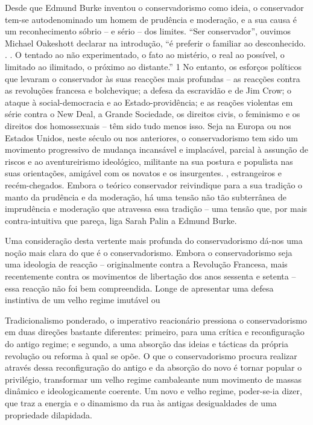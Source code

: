 Desde que Edmund Burke inventou o conservadorismo como ideia, o conservador tem-se autodenominado um homem de prudência e moderação, e a sua causa é um reconhecimento sóbrio – e sério – dos limites. “Ser conservador”, ouvimos Michael Oakeshott declarar na introdução, “é preferir o familiar ao desconhecido. . . O tentado ao não experimentado, o fato ao mistério, o real ao possível, o limitado ao ilimitado, o próximo ao distante.” {\color{blue}1} No entanto, os esforços políticos que levaram o conservador às suas reacções mais profundas – as reacções contra as revoluções francesa e bolchevique; a defesa da escravidão e de Jim Crow; o ataque à social-democracia e ao Estado-providência; e as reações violentas em série contra o New Deal, a Grande Sociedade, os direitos civis, o feminismo e os direitos dos homossexuais – têm sido tudo menos isso. Seja na Europa ou nos Estados Unidos, neste século ou nos anteriores, o conservadorismo tem sido um movimento progressivo de mudança incansável e implacável, parcial à assunção de riscos e ao aventureirismo ideológico, militante na sua postura e populista nas suas orientações, amigável com os novatos e os insurgentes. , estrangeiros e recém-chegados. Embora o teórico conservador reivindique para a sua tradição o manto da prudência e da moderação, há uma tensão não tão subterrânea de imprudência e moderação que atravessa essa tradição – uma tensão que, por mais contra-intuitiva que pareça, liga Sarah Palin a Edmund Burke.
 \par 
Uma consideração desta vertente mais profunda do conservadorismo dá-nos uma noção mais clara do que é o conservadorismo. Embora o conservadorismo seja uma ideologia de reacção – originalmente contra a Revolução Francesa, mais recentemente contra os movimentos de libertação dos anos sessenta e setenta – essa reacção não foi bem compreendida. Longe de apresentar uma defesa instintiva de um velho regime imutável ou
 \par 
Tradicionalismo ponderado, o imperativo reacionário pressiona o conservadorismo em duas direções bastante diferentes: primeiro, para uma crítica e reconfiguração do antigo regime; e segundo, a uma absorção das ideias e tácticas da própria revolução ou reforma à qual se opõe. O que o conservadorismo procura realizar através dessa reconfiguração do antigo e da absorção do novo é tornar popular o privilégio, transformar um velho regime cambaleante num movimento de massas dinâmico e ideologicamente coerente. Um novo e velho regime, poder-se-ia dizer, que traz a energia e o dinamismo da rua às antigas desigualdades de uma propriedade dilapidada.
